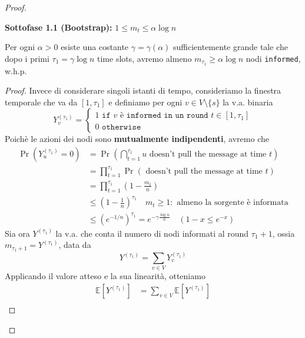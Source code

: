 \begin{teorema}
\begin{proof}
\begin{description}
            \textbf{Sottofase 1.1 (Bootstrap): } $1 \leq m_t \leq \alpha \log n$
            \begin{lemma}
                Per ogni $\alpha > 0$ esiste una costante $\gamma = \gamma(\alpha)$ sufficientemente grande tale che dopo i primi $\tau_1 = \gamma \log n$ time slots, avremo almeno $m_{\tau_1} \geq \alpha \log n$ nodi \texttt{informed}, w.h.p.
                \begin{proof}
                    Invece di considerare singoli istanti di tempo, consideriamo la finestra temporale che va da $[1, \tau_1]$ e definiamo per ogni $v \in V \setminus \{s\}$ la v.a. binaria 
                    \[
                        Y_v^{(\tau_1)} = 
                        \begin{cases*}
                            1 \texttt{ if } v \texttt{ è informed in un round } t \in [1, \tau_1] \\
                            0 \texttt{ otherwise}
                        \end{cases*}
                    \]
                    Poichè le azioni dei nodi sono \textbf{mutualmente indipendenti}, avremo che 
                    \begin{align*}
                        \Pr(Y^{(\tau_1)}_u = 0) 
                        &= \Pr \left( \bigcap_{t = 1}^{\tau_1} u \text{ doesn't pull the message at time } t \right) \\
                        &= \prod_{t = 1}^{\tau_1} \Pr (\text{ doesn't pull the message at time } t) \\
                        &= \prod_{t = 1}^{\tau_1} \left( 1 - \frac{m_t}{n} \right) \\
                        &\leq \left( 1 - \frac{1}{n} \right)^{\tau_1} \quad m_t \geq 1: \text{ almeno la sorgente è informata} \\
                        &\leq  \left( e^{-1/n} \right)^{\tau_1} = e^{-\gamma\frac{\log n}{n}} \quad (1 - x \leq e^{-x})
                    \end{align*}
                    Sia ora $Y^{(\tau_1)}$ la v.a. che conta il numero di nodi informati al round $\tau_1 + 1$, ossia $m_{\tau_1 + 1} = Y^{(\tau_1)}$, data da 
                    \[
                        Y^{(\tau_1)} = \sum_{v \in V} Y_v^{(\tau_1)}
                    \]
                    Applicando il valore atteso e la sua linearità, otteniamo
                    \begin{align*}
                        \mathbb{E}\left[Y^{(\tau_1)}\right] 
                        &= \sum_{v \in V} \mathbb{E}\left[Y^{(\tau_1)}\right] \\

\end{align*}
\end{proof}
\end{lemma}
\end{description}
\end{proof}
\end{teorema}
